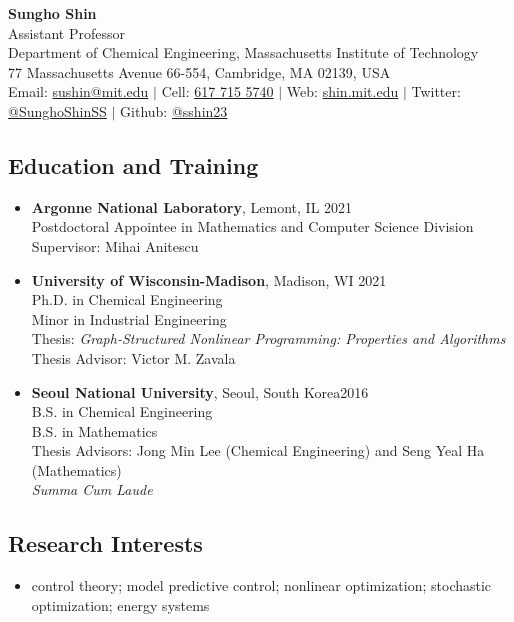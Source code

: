 \documentclass[letterpaper, 11pt]{article}
\begin{document}
\thispagestyle{empty}
\begin{center}
  {\bf\Large Sungho Shin}\\[.25em]
  Assistant Professor\\
Department of Chemical Engineering, Massachusetts Institute of Technology
\\
  77 Massachusetts Avenue 66-554, Cambridge, MA 02139, USA
\\
  Email: \href{mailto:sushin@mit.edu}{sushin@mit.edu} $|$ Cell: \href{tel:6177155740}{617 715 5740} $|$ Web: \href{https://shin.mit.edu}{shin.mit.edu} $|$ Twitter: \href{https://twitter.com/SunghoShinSS}{@SunghoShinSS} $|$ Github: \href{https://github.com/sshin23}{@sshin23} 
\end{center}


\subsection*{Education and Training}
\begin{itemize}[leftmargin=*]
\item[]
  {\bf Argonne National Laboratory}, Lemont, IL \hfill 2021\\
  Postdoctoral Appointee in {Mathematics and Computer Science Division} \\
  Supervisor: Mihai Anitescu
\item[]
  {\bf University of Wisconsin-Madison}, Madison, WI \hfill 2021\\
  {Ph.D. in Chemical Engineering} \\
  {Minor in Industrial Engineering}\\
  Thesis: {\it Graph-Structured Nonlinear Programming: Properties and Algorithms}\\
  Thesis Advisor: Victor M. Zavala
\item[]
  {\bf Seoul National University}, Seoul, South Korea\hfill 2016 \\
  {B.S. in Chemical Engineering}\\
  {B.S. in Mathematics}\\
  Thesis Advisors: Jong Min Lee (Chemical Engineering) and Seng Yeal Ha (Mathematics)\\
  {\it Summa Cum Laude}
\end{itemize}

\subsection*{Research Interests}
\begin{itemize}[leftmargin=*]
\item[] control theory; model predictive control; nonlinear optimization; stochastic optimization; energy systems
\end{itemize}
\end{document}
